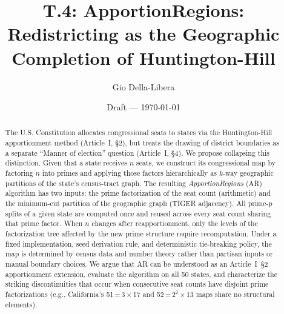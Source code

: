 \documentclass[12pt]{article}
\title{T.4: ApportionRegions:\\
       Redistricting as the Geographic Completion of Huntington-Hill}
\author{Gio Della-Libera}
\date{Draft --- \today}
\begin{document}
\maketitle

\begin{abstract}
The U.S. Constitution allocates congressional seats to states via the
Huntington-Hill apportionment method (Article~I, \S2), but treats the drawing
of district boundaries as a separate ``Manner of election'' question (Article~I,
\S4). We propose collapsing this distinction. Given that a state receives $n$
seats, we construct its congressional map by factoring $n$ into primes and
applying those factors hierarchically as $k$-way geographic partitions of the
state's census-tract graph. The resulting \emph{ApportionRegions}
(AR) algorithm has two inputs: the prime factorization of the seat count
(arithmetic) and the minimum-cut partition of the geographic graph (TIGER
adjacency). All prime-$p$ splits of a given state are computed once and reused
across every seat count sharing that prime factor. When $n$ changes after
reapportionment, only the levels of the factorization tree affected by the new
prime structure require recomputation. Under a fixed implementation, seed
derivation rule, and deterministic tie-breaking policy, the map is determined
by census data and number theory rather than partisan inputs or manual boundary
choices. We argue that AR can be understood as an Article~I~\S2 apportionment
extension,
evaluate the algorithm on all 50 states, and characterize the striking
discontinuities that occur when consecutive seat counts have disjoint prime
factorizations (e.g., California's 51\,=\,3\,$\times$\,17 and
52\,=\,$2^2\times 13$ maps share no structural elements).
\end{abstract}










\end{document}
